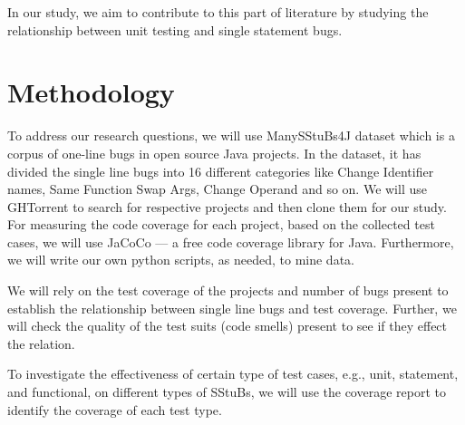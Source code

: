 \documentclass[11pt]{article}
\begin{document}
In our study, we aim to contribute to this part of literature by studying the relationship between unit testing and single statement bugs.



\section{Methodology}

To address our research questions, we will use ManySStuBs4J\cite{karampatsis2020often} dataset which is a corpus of one-line bugs in open source Java projects. In the dataset, it has divided the single line bugs into 16 different categories like Change Identifier names, Same Function Swap Args, Change Operand and so on. We will use GHTorrent \cite{Gousi13} to search for respective projects and then clone them for our study. For measuring the code coverage for each project, based on the collected test cases, we will use JaCoCo — a free code coverage library for Java. Furthermore, we will write our own python scripts, as needed, to mine data.

We will rely on the test coverage of the projects and number of bugs present to establish the relationship between single line bugs and test coverage. Further, we will check the quality of the test suits (code smells) present to see if they effect the relation.

To investigate the effectiveness of certain type of test cases, e.g., unit, statement, and functional, on different types of SStuBs, we will use the coverage report to identify the coverage of each test type.




\end{document}
